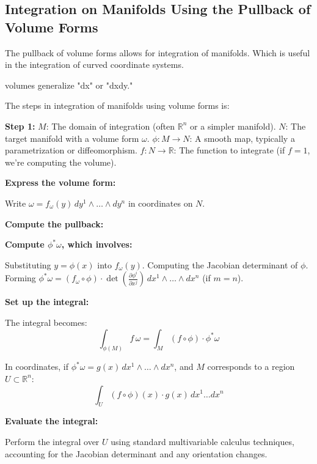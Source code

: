 \subsection{Integration on Manifolds Using the Pullback of Volume Forms}
The pullback of volume forms allows for integration of manifolds. Which is useful in the integration of curved coordinate systems.

volumes generalize "dx" or "dxdy."

The steps in integration of manifolds using volume forms is:

\textbf{Step 1:} $   M   $: The domain of integration (often $   \mathbb{R}^n   $ or a simpler manifold).
$   N   $: The target manifold with a volume form $   \omega   $.
$   \phi: M \to N   $: A smooth map, typically a parametrization or diffeomorphism.
$   f: N \to \mathbb{R}   $: The function to integrate (if $   f = 1   $, we’re computing the volume).


\textbf{Express the volume form:}

Write $   \omega = f_\omega(y) \, dy^1 \wedge \dots \wedge dy^n   $ in coordinates on $   N   $.


\textbf{Compute the pullback:}

\textbf{Compute $   \phi^* \omega   $, which involves:}

Substituting $   y = \phi(x)   $ into $   f_\omega(y)   $.
Computing the Jacobian determinant of $   \phi   $.
Forming $   \phi^* \omega = (f_\omega \circ \phi) \cdot \det \left( \frac{\partial \phi^i}{\partial x^j} \right) \, dx^1 \wedge \dots \wedge dx^n   $ (if $   m = n   $).




\textbf{Set up the integral:}

The integral becomes:
$$\int_{\phi(M)} f \, \omega = \int_M (f \circ \phi) \cdot \phi^* \omega$$

In coordinates, if $   \phi^* \omega = g(x) \, dx^1 \wedge \dots \wedge dx^n   $, and $   M   $ corresponds to a region $   U \subset \mathbb{R}^n   $:
$$\int_U (f \circ \phi)(x) \cdot g(x) \, dx^1 \dots dx^n$$



\textbf{Evaluate the integral:}

Perform the integral over $   U   $ using standard multivariable calculus techniques, accounting for the Jacobian determinant and any orientation changes.
